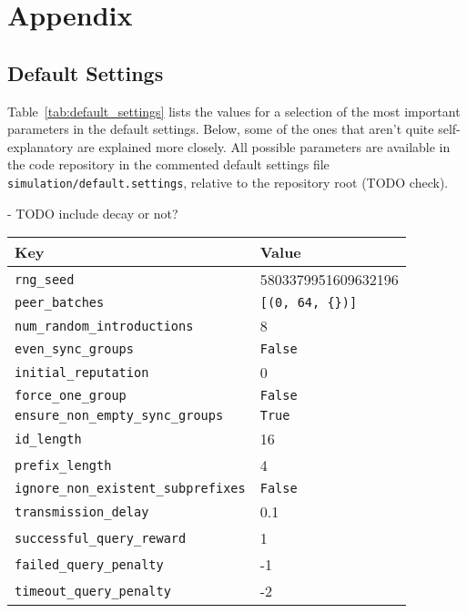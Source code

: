 \chapter{Appendix}
\section{Default Settings}
\label{sec:app_default_settings}
Table~\ref{tab:default_settings} lists the values for a selection of the most
important parameters in the default settings. Below, some of the ones that
aren't quite self-explanatory are explained more closely. All possible
parameters are available in the code repository in the commented default
settings file \texttt{simulation/default.settings}, relative to the repository
root (TODO check).

- TODO include decay or not?
\begin{longtable}{|l|l|}
\hline
\rowcolor{slightgray} \T Key & Value \B\\
\hline
\cellcolor{slightgray}\T \texttt{rng\_seed} & 5803379951609632196 \B\\
\hline
\cellcolor{slightgray}\T \texttt{peer\_batches} & \texttt{[(0, 64, \{\})]} \B\\
\hline
\cellcolor{slightgray}\T \texttt{num\_random\_introductions} & 8 \B\\
\hline
\cellcolor{slightgray}\T \texttt{even\_sync\_groups} & \texttt{False} \B\\
\hline
\cellcolor{slightgray}\T \texttt{initial\_reputation} & 0 \B\\
\hline
\cellcolor{slightgray}\T \texttt{force\_one\_group} & \texttt{False} \B\\
\hline
\cellcolor{slightgray}\T \texttt{ensure\_non\_empty\_sync\_groups} & \texttt{True} \B\\
\hline
\cellcolor{slightgray}\T \texttt{id\_length} & 16 \B\\
\hline
\cellcolor{slightgray}\T \texttt{prefix\_length} & 4 \B\\
\hline
\cellcolor{slightgray}\T \texttt{ignore\_non\_existent\_subprefixes} & \texttt{False} \B\\
\hline
\cellcolor{slightgray}\T \texttt{transmission\_delay} & 0.1 \B\\
\hline
\cellcolor{slightgray}\T \texttt{successful\_query\_reward} & 1 \B\\
\hline
\cellcolor{slightgray}\T \texttt{failed\_query\_penalty} & -1 \B\\
\hline
\cellcolor{slightgray}\T \texttt{timeout\_query\_penalty} & -2 \B\\

\end{longtable}
